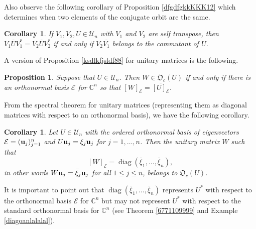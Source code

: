\documentclass{dis}
\theoremstyle{plain}
\newtheorem{Proposition}[equation]{Proposition}
\newtheorem{Corollary}[equation]{Corollary}
\theoremstyle{definition}
\def\C{\mathbb{C}}
\renewcommand{\leq}{\leqslant}
\renewcommand{\vec}[1]{{\bf #1}}
\newcommand{\0}{{\color{lightgray}0}}
\begin{document}
Also observe the following corollary of Proposition \ref{dfgdfgkkKKK12} which determines when two elements of the conjugate orbit are the same. 

\begin{Corollary}\label{samememmee}
If $V_1, V_2, U \in \mathscr{U}_{n}$ with $V_1$ and $V_2$ are self transpose, then $V_1 \overline{U} V_{1}^{*} = V_2 \overline{U} V_{2}^{*}$ if and only if $V_{2} \overline{V_{1}}$ belongs to the commutant of $U$. 
\end{Corollary}


A version of Proposition \ref{ksdlkfjsldf88} for unitary matrices is the following.

\begin{Proposition}
Suppose that $U \in \mathscr{U}_n$. Then $W \in \mathfrak{O}_c(U)$ if and only if there is an orthonormal basis $\mathcal{E}$ for $\C^n$ so that $ [W]_{\mathcal{E}} = \overline{[U]_{\mathcal{E}}}$.
\end{Proposition}

From the spectral theorem for unitary matrices (representing them as diagonal matrices with respect to an orthonormal basis), we have the following corollary.

\begin{Corollary}
Let $U \in \mathscr{U}_n$ with the ordered orthonormal basis of eigenvectors
$\mathcal{E} = (\vec{u}_{j})_{j = 1}^{n} $ and
$U \vec{u}_j = \xi_j \vec{u}_j$ for $j = 1, \ldots, n$. Then the unitary matrix $W$ such that
$$[W]_{\mathcal{E}} = \operatorname{diag}(\bar\xi_1, \ldots, \bar \xi_n),$$
in other words $W \vec{u}_j = \bar \xi_j \vec{u}_j$ for all $1 \leq j \leq n$, belongs to $\mathfrak{O}_c(U)$.
\end{Corollary}

It is important to point out that $ \operatorname{diag}(\bar\xi_1, \ldots, \bar \xi_n)$ represents  $U^{*}$ with respect to the orthonormal basis $\mathcal{E}$ for $\C^n$ but may not represent $U^{*}$ with respect to the standard orthonormal basis for $\C^n$  (see Theorem \ref{6771109999} and Example \ref{diagoanlalalal}). 


\end{document}
